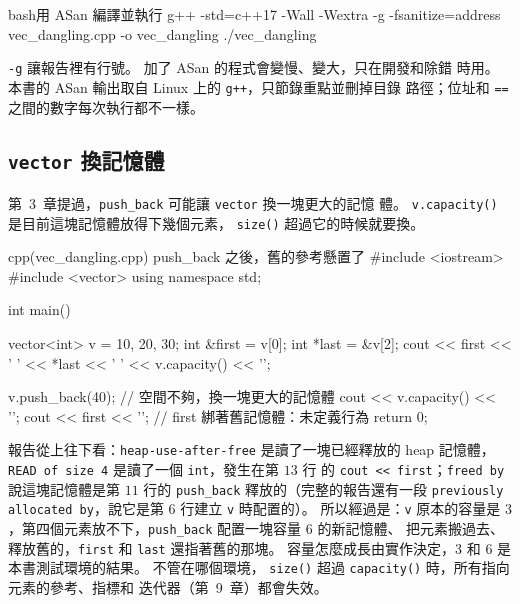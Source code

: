 \begin{code}{bash}{用 ASan 編譯並執行}
g++ -std=c++17 -Wall -Wextra -g -fsanitize=address vec_dangling.cpp -o vec_dangling
./vec_dangling
\end{code}

\texttt{-g} 讓報告裡有行號。 加了 ASan 的程式會變慢、變大，只在開發和除錯
時用。 本書的 ASan 輸出取自 Linux 上的 \texttt{g++}，只節錄重點並刪掉目錄
路徑；位址和 \texttt{==} 之間的數字每次執行都不一樣。

\subsection{\texttt{vector} 換記憶體}

第~3~章提過，\texttt{push\_back} 可能讓 \texttt{vector} 換一塊更大的記憶
體。 \texttt{v.capacity()} 是目前這塊記憶體放得下幾個元素，
\texttt{size()} 超過它的時候就要換。

\begin{example}[label=ex:vec-dangling]{cpp}{(vec\_dangling.cpp) push\_back 之後，舊的參考懸置了}
#include <iostream>
#include <vector>
using namespace std;

int main() {
    vector<int> v = {10, 20, 30};
    int &first = v[0];
    int *last = &v[2];
    cout << first << ' ' << *last << ' ' << v.capacity() << '\n';

    v.push_back(40);         // 空間不夠，換一塊更大的記憶體
    cout << v.capacity() << '\n';
    cout << first << '\n';   // first 綁著舊記憶體：未定義行為
    return 0;
}
\end{example}


報告從上往下看：\texttt{heap-use-after-free} 是讀了一塊已經釋放的 heap
記憶體，\texttt{READ of size 4} 是讀了一個 \texttt{int}，發生在第 $13$ 行
的 \texttt{cout << first}；\texttt{freed by} 說這塊記憶體是第 $11$ 行的
\texttt{push\_back} 釋放的（完整的報告還有一段
\texttt{previously allocated by}，說它是第 $6$ 行建立 \texttt{v} 時配置的）。
所以經過是：\texttt{v} 原本的容量是
$3$，第四個元素放不下，\texttt{push\_back} 配置一塊容量 $6$ 的新記憶體、
把元素搬過去、釋放舊的，\texttt{first} 和 \texttt{last} 還指著舊的那塊。
容量怎麼成長由實作決定，$3$ 和 $6$ 是本書測試環境的結果。 不管在哪個環境，
\texttt{size()} 超過 \texttt{capacity()} 時，所有指向元素的參考、指標和
迭代器（第~9~章）都會失效。


